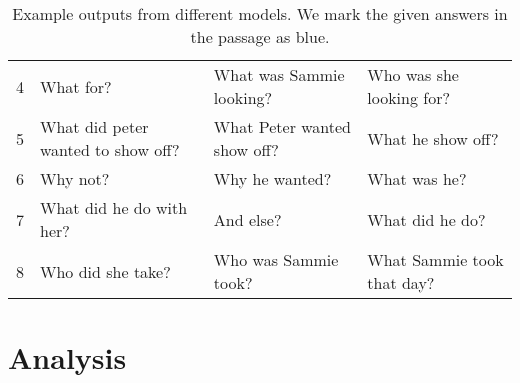 \documentclass[11pt,a4paper]{article}
\begin{document}
\begin{table*}[t!]
\begin{tabular}{clll}
		\multicolumn{1}{c|}{4} &
		\multicolumn{1}{l|}{What for?} &
		\multicolumn{1}{l|}{What was Sammie looking?} &
		\multicolumn{1}{l}{Who was she looking for?} \\
		
		\multicolumn{1}{c|}{5} &
		\multicolumn{1}{l|}{What did peter wanted to show off?} &
		\multicolumn{1}{l|}{What Peter wanted show off?} &
		\multicolumn{1}{l}{What he show off?} \\
		
		\multicolumn{1}{c|}{6} &
		\multicolumn{1}{l|}{Why not?} &
		\multicolumn{1}{l|}{Why he wanted?} &
		\multicolumn{1}{l}{What was he?} \\
		
		\multicolumn{1}{c|}{7} &
		\multicolumn{1}{l|}{What did he do with her?} &
		\multicolumn{1}{l|}{And else?} &
		\multicolumn{1}{l}{What did he do?} \\
		
		\multicolumn{1}{c|}{8} &
		\multicolumn{1}{l|}{Who did she take?} &
		\multicolumn{1}{l|}{Who was Sammie took?} &
		\multicolumn{1}{l}{What Sammie took that day?} \\
		\hline

	\end{tabular}
	\caption{Example outputs from different models. We mark the given answers in the passage as blue.}
	\label{Tab:RunningExamples}
	\end{table*}

\section{Analysis}
\end{document}
